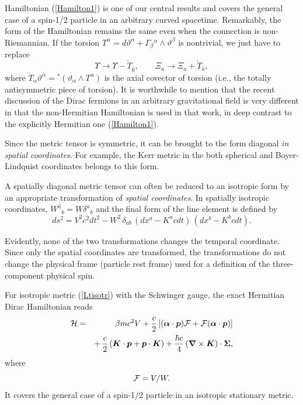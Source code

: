 \documentclass[preprint,showpacs,preprintnumbers,eqsecnum,amsmath,amssymb]{revtex4}
\begin{document}
Hamiltonian (\ref{Hamilton1}) is one of our central results and
covers the general case of a spin-1/2 particle in an arbitrary
curved spacetime. Remarkably, the form of the Hamiltonian remains
the same even when the connection is non-Riemannian. If the
torsion $T^\alpha = d\vartheta^\alpha + \Gamma_\beta{}^\alpha\wedge
\vartheta^\beta $ is nontrivial, we just have to replace
\begin{equation}\label{torsion}
\Upsilon\rightarrow\Upsilon - \check{T}_{\widehat{0}},\qquad
{\Xi}_a\rightarrow{\Xi}_a + \check{T}_{\widehat{a}},
\end{equation}
where $\check{T}_\alpha\vartheta^\alpha =
{}^\ast(\vartheta_\alpha\wedge T^\alpha)$ is the axial covector of
torsion (i.e., the totally antisymmetric piece of torsion). It is
worthwhile to mention that the recent discussion \cite{GM} of the
Dirac fermions in an arbitrary gravitational field is very
different in that the non-Hermitian Hamiltonian is used in that
work, in deep contrast to the explicitly Hermitian one
(\ref{Hamilton1}).

Since the metric tensor is symmetric, it can be brought to the form diagonal 
\emph{in spatial coordinates}. For example, the Kerr metric in the both 
spherical and Boyer-Lindquist coordinates belongs to this form. 

A spatially diagonal metric tensor can often be reduced to an isotropic 
form by an appropriate transformation of \emph{spatial coordinates}. 
In spatially isotropic coordinates, $W^{\widehat a}{}_b=W\delta^{a}{}_b$ and 
the final form of the line element is defined by
\begin{equation}\label{Ltisotr}
ds^2 = V^2c^2dt^2 - W^2\,\delta_{ab}\,(dx^a - K^acdt)\,(dx^b - K^bcdt).
\end{equation}

Evidently, none of the two transformations changes the temporal
coordinate. Since only the spatial coordinates are transformed,
the transformations do not change the physical frame (particle
rest frame) used for a definition of the three-component physical spin.

For isotropic metric (\ref{Ltisotr}) with the Schwinger gauge, the
exact Hermitian Dirac Hamiltonian reads \cite{OST}
\begin{eqnarray}
{\cal H} &=& \beta mc^2V + {\frac c 2}\left[(\bm{\alpha}
\cdot\bm{p}){\cal F} + {\cal F}(\bm{\alpha}\cdot\bm{p})\right]\nonumber\\
&& +\,{\frac c2}\left(\bm{K}\cdot\bm{p} + \bm{p}\cdot\bm{K}\right)
+ {\frac {\hbar
c}4}\,(\bm{\nabla}\times\bm{K})\cdot\bm{\Sigma},\label{Hamiltonian1}
\end{eqnarray}
where
\begin{equation}\label{deff}{\cal F} = V/W.
\end{equation}
It covers the general case of a spin-1/2 particle in an isotropic
stationary metric.
\end{document}
